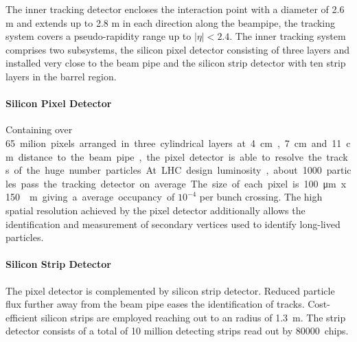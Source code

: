 The inner tracking detector encloses the interaction point with a diameter of 2.6 m and
extends up to 2.8 m in each direction along the beampipe, the tracking system covers a
pseudo-rapidity range up to $|\eta| < 2.4$. The inner tracking system comprises
two subsystems, the silicon pixel detector consisting of three layers and
installed very close to the beam pipe and the silicon strip detector with ten
strip layers in the barrel region. 

\paragraph{Silicon Pixel Detector} Containing over \SI{65} milion pixels
arranged in three cylindrical layers at \SI{4}{\centi\meter},
\SI{7}{\centi\meter} and \SI{11}{\centi\meter} distance to the beam pipe, the
pixel detector is able to resolve the tracks of the huge number particles. At
LHC design luminosity, about 1000 particles pass the tracking detector on
average. The size of each pixel is \SI{100}{\micro \meter} x \SI{150}{\micro
\meter} giving a average occupancy of $10^{-4}$ per bunch crossing.  The high
spatial resolution achieved by the pixel detector additionally allows the
identification and measurement of secondary vertices used to identify long-lived
particles.

\paragraph{Silicon Strip Detector} The pixel detector is complemented by silicon
strip detector. Reduced particle flux further away from the beam pipe eases the identification
of tracks. Cost-efficient silicon strips are employed reaching out to
an radius of \SI{1.3}{\meter}. The strip detector consists of a total of 10 million
detecting strips read out by \SI{80000} chips. 

